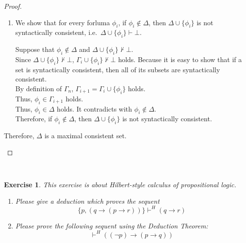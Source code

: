 \documentclass[12pt,a4paper]{article}
\theoremstyle{plain}
\newtheorem{exercise}{Exercise}
\theoremstyle{definition}
\begin{document}
\begin{proof}
\begin{enumerate}
\begin{enumerate}
            \item
            We show that for every forluma $\phi _i$, if $\phi_i \not \in \Delta$, then $\Delta \cup \{ \phi_i \}$ is not syntactically consistent, i.e.\ $\Delta \cup \{ \phi_i \} \vdash \bot$.
            
            Suppose that $\phi_i \not \in \Delta$ and $\Delta \cup \{ \phi_i \} \not \vdash \bot$.\\
            Since $\Delta \cup \{ \phi_i \} \not \vdash \bot$, $\Gamma_i \cup \{ \phi_i \} \not \vdash \bot$ holds. Because it is easy to show that if a set is syntactically consistent, then all of its subsets are syntactically consistent.\\
            By definition of $\Gamma_n$, $\Gamma_{i+1}=\Gamma_i \cup \{ \phi_i \}$ holds.\\
            Thus, $\phi_i \in \Gamma_{i+1}$ holds.\\
            Thus, $\phi_i \in \Delta$ holds. It contradicts with $\phi_i \not \in \Delta$.\\
            Therefore, if $\phi_i \not \in \Delta$, then $\Delta \cup \{ \phi_i \}$ is not syntactically consistent.
        \end{enumerate}
    Therefore, $\Delta$ is a maximal consistent set.
    
\end{enumerate}
\end{proof}

\ \\
\begin{exercise}
This exercise is about Hilbert-style calculus of propositional logic.
%
\begin{enumerate}

\item Please give a deduction which proves the sequent 
%
\[
\{ p , ( q \rightarrow ( p \rightarrow r )) \} \vdash^H ( q \rightarrow r )
\] 

\item Please prove the following sequent using the Deduction Theorem:
%
\[
\vdash^H ( ( \neg p ) \rightarrow ( p \rightarrow q ) )
\]

\end{enumerate}
\end{exercise}
\end{document}

